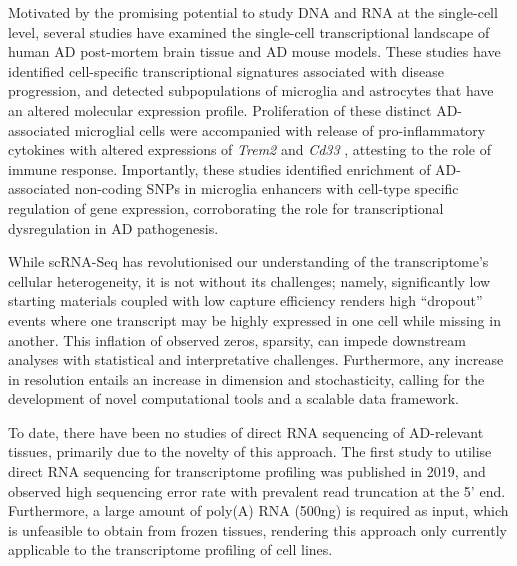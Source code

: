 Motivated by the promising potential to study DNA and RNA at the single-cell level, several studies have examined the single-cell transcriptional landscape of human AD post-mortem brain tissue\cite{Mathys2019,Nott2019,Thrupp2020,Olah2020,Leng2021,Young2021} and AD mouse models\cite{Keren-Shaul2017,Mathys2017}. These studies have identified cell-specific transcriptional signatures associated with disease progression, and detected subpopulations of microglia and astrocytes that have an altered molecular expression profile. Proliferation of these distinct AD-associated microglial cells were accompanied with release of pro-inflammatory cytokines\cite{Mathys2017} with altered expressions of \textit{Trem2} and \textit{Cd33} \cite{Mathys2019,Frigerio2019}, attesting to the role of immune response. Importantly, these studies identified enrichment of AD-associated non-coding SNPs in microglia enhancers with cell-type specific regulation of gene expression\cite{Tansey2018,Nott2019,Young2021,Novikova2021}, corroborating the role for transcriptional dysregulation in AD pathogenesis.   

While scRNA-Seq has revolutionised our understanding of the transcriptome's cellular heterogeneity, it is not without its challenges; namely, significantly low starting materials coupled with low capture efficiency renders high “dropout” events where one transcript may be highly expressed in one cell while missing in another\cite{Lahnemann2020,Adil2021}. This inflation of observed zeros, sparsity, can impede downstream analyses with statistical and interpretative challenges\cite{Adil2021}. Furthermore, any increase in resolution entails an increase in dimension and stochasticity, calling for the development of novel computational tools and a scalable data framework\cite{Lahnemann2020}. 

\newpage
{}
To date, there have been no studies of direct RNA sequencing of AD-relevant tissues, primarily due to the novelty of this approach. The first study to utilise direct RNA sequencing for transcriptome profiling was published in 2019, and observed high sequencing error rate with prevalent read truncation at the 5' end\cite{Workman2019a}. Furthermore, a large amount of poly(A) RNA (500ng) is required as input, which is unfeasible to obtain from frozen tissues, rendering this approach only currently applicable to the transcriptome profiling of cell lines.      
  

